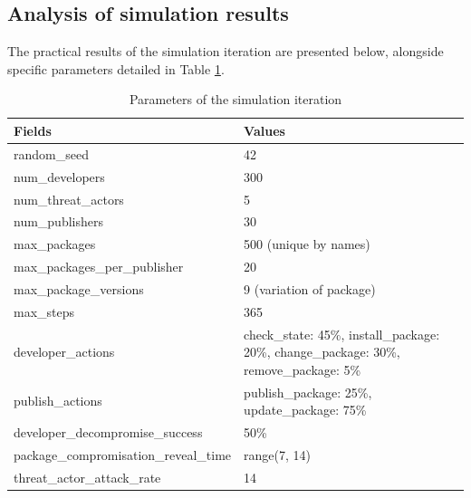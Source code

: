 \subsection{Analysis of simulation results}

The practical results of the simulation iteration are presented below, alongside specific parameters detailed in Table \ref{tab:parameters_of_the_simulation_iteration}.

\begin{table}[htbp]
    \centering
    \begin{tabular}{|l|p{6cm}|}
        \hline
        \textbf{Fields} & \textbf{Values} \\
        \hline
        random\_seed & 42 \\
        \hline
        num\_developers & 300 \\
        \hline
        num\_threat\_actors & 5 \\
        \hline
        num\_publishers & 30 \\
        \hline
        max\_packages & 500 (unique by names) \\
        \hline
        max\_packages\_per\_publisher & 20 \\
        \hline
        max\_package\_versions & 9 (variation of package) \\
        \hline
        max\_steps & 365 \\
        \hline
        developer\_actions & check\_state: 45\%, install\_package: 20\%, change\_package: 30\%, remove\_package: 5\% \\
        \hline
        publish\_actions & publish\_package: 25\%, update\_package: 75\% \\
        \hline
        developer\_decompromise\_success & 50\% \\
        \hline
        package\_compromisation\_reveal\_time & range(7, 14) \\
        \hline
        threat\_actor\_attack\_rate & 14 \\
        \hline
    \end{tabular}
    \caption{Parameters of the simulation iteration}
    \label{tab:parameters_of_the_simulation_iteration}
\end{table}

